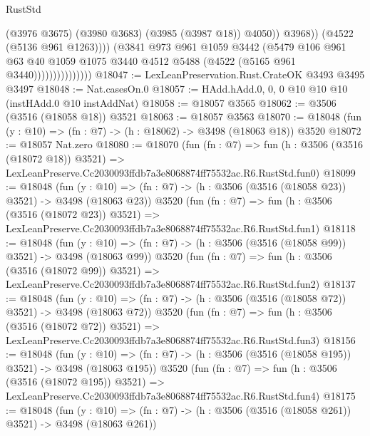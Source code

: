 \begin{lexlean}{RustStd}
\begin{coremodule}
                                      (@3976 @3675)
                                      (@3980 @3683)
                                      (@3985 (@3987 @18))
                                      @4050))
                                  @3968))
                              (@4522 (@5136 @961 @1263))))
                          (@3841
                            @973
                            @961
                            @1059
                            @3442
                            (@5479
                              @106
                              @961
                              @63
                              @40
                              @1059
                              @1075
                              @3440
                              @4512
                              @5488
                              (@4522 (@5165 @961 @3440)))))))))))))))
@18047 := LexLeanPreservation.Rust.CrateOK @3493 @3495 @3497
@18048 := Nat.casesOn.{0}
@18057 := HAdd.hAdd.{0, 0, 0} @10 @10 @10 (instHAdd.{0} @10 instAddNat)
@18058 := @18057 @3565
@18062 := @3506 (@3516 (@18058 @18)) @3521
@18063 := @18057 @3563
@18070 := @18048 (fun (y : @10) => (fn : @7) -> (h : @18062) -> @3498 (@18063 @18)) @3520
@18072 := @18057 Nat.zero
@18080 := @18070
    (fun (fn : @7) =>
    fun (h : @3506 (@3516 (@18072 @18)) @3521) =>
    LexLeanPreserve.Cc2030093ffdb7a3e8068874ff75532ac.R6.RustStd.fun0)
@18099 := @18048
    (fun (y : @10) => (fn : @7) -> (h : @3506 (@3516 (@18058 @23)) @3521) -> @3498 (@18063 @23))
    @3520
    (fun (fn : @7) =>
    fun (h : @3506 (@3516 (@18072 @23)) @3521) =>
    LexLeanPreserve.Cc2030093ffdb7a3e8068874ff75532ac.R6.RustStd.fun1)
@18118 := @18048
    (fun (y : @10) => (fn : @7) -> (h : @3506 (@3516 (@18058 @99)) @3521) -> @3498 (@18063 @99))
    @3520
    (fun (fn : @7) =>
    fun (h : @3506 (@3516 (@18072 @99)) @3521) =>
    LexLeanPreserve.Cc2030093ffdb7a3e8068874ff75532ac.R6.RustStd.fun2)
@18137 := @18048
    (fun (y : @10) => (fn : @7) -> (h : @3506 (@3516 (@18058 @72)) @3521) -> @3498 (@18063 @72))
    @3520
    (fun (fn : @7) =>
    fun (h : @3506 (@3516 (@18072 @72)) @3521) =>
    LexLeanPreserve.Cc2030093ffdb7a3e8068874ff75532ac.R6.RustStd.fun3)
@18156 := @18048
    (fun (y : @10) => (fn : @7) -> (h : @3506 (@3516 (@18058 @195)) @3521) -> @3498 (@18063 @195))
    @3520
    (fun (fn : @7) =>
    fun (h : @3506 (@3516 (@18072 @195)) @3521) =>
    LexLeanPreserve.Cc2030093ffdb7a3e8068874ff75532ac.R6.RustStd.fun4)
@18175 := @18048
    (fun (y : @10) => (fn : @7) -> (h : @3506 (@3516 (@18058 @261)) @3521) -> @3498 (@18063 @261))

\end{coremodule}
\end{lexlean}
